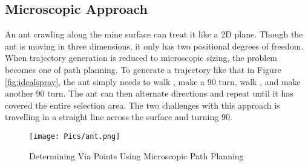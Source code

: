 \subsection{Microscopic Approach}

An ant crawling along the mine surface can treat it like a 2D plane. Though the ant is moving in three dimensions, it only has two positional degrees of freedom. When trajectory generation is reduced to microscopic sizing, the problem becomes one of path planning. To generate a trajectory like that in Figure \ref{fig:idealspray}, the ant simply needs to walk , make a 90\degree\hspace{0pt} turn, walk , and make another 90\degree\hspace{0pt} turn. The ant can then alternate directions and repeat until it has covered the entire selection area. The two challenges with this approach is travelling in a straight line across the surface and turning 90\degree\hspace{0pt}.\\


\begin{figure}[h!]
    \centering
    \texttt{[image: Pics/ant.png]}
    \caption{Determining Via Points Using Microscopic Path Planning}
    \label{fig:ant}
\end{figure}

